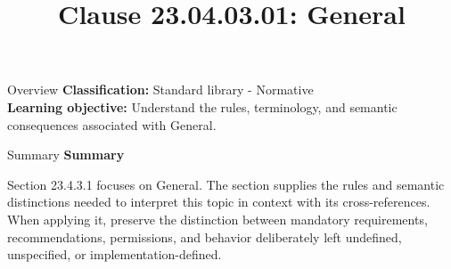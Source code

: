 \documentclass[10pt,letterpaper]{article}
\title{Clause 23.04.03.01: General}
\author{}
\date{}
\begin{document}
\maketitle
\begin{CornellOverviewBox}{Overview}
\textbf{Classification:} Standard library - Normative\\[2pt]
\textbf{Learning objective:} Understand the rules, terminology, and semantic consequences associated with General.
\end{CornellOverviewBox}\begin{CornellSummaryBox}{Summary}
{\sffamily\bfseries\color{Accent} Summary}\par\vspace{3pt}Section 23.4.3.1 focuses on General. The section supplies the rules and semantic distinctions needed to interpret this topic in context with its cross-references. When applying it, preserve the distinction between mandatory requirements, recommendations, permissions, and behavior deliberately left undefined, unspecified, or implementation-defined.
\end{CornellSummaryBox}
\end{document}
